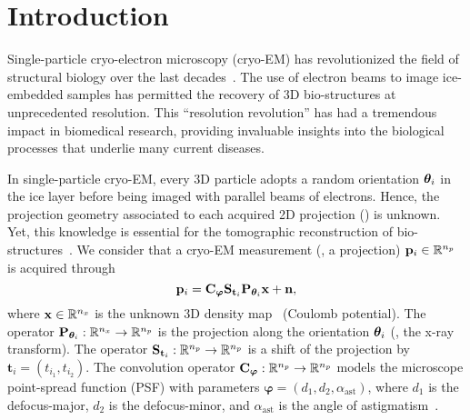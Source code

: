 \section{Introduction}\label{sec:introduction}

Single-particle cryo-electron microscopy (cryo-EM) has revolutionized the field of structural biology over the last decades~\cite{dubochet1988cryo, frank2006three, chap0-nat2015MethodYear}.
The use of electron beams to image ice-embedded samples has permitted the recovery of 3D bio-structures at unprecedented resolution.
This ``resolution revolution'' has had a tremendous impact in biomedical research, providing invaluable insights into the biological processes that underlie many current diseases.

In single-particle cryo-EM, every 3D particle adopts a random orientation ${\boldsymbol{\theta}}_i$ in the ice layer before being imaged with parallel beams of electrons.
Hence, the projection geometry associated to each acquired 2D projection () is unknown.
Yet, this knowledge is essential for the tomographic reconstruction of bio-structures~\cite{Natterer2001mathematics}.
We consider that a cryo-EM measurement (\ie, a projection) $\mathbf{p}_i \in \mathbb{R}^{n_p}$ is acquired through
\begin{equation}
    \label{eqn:imaging-model}
    \mathbf{p}_i = \mathbf{C}_{\boldsymbol\varphi} \mathbf{S}_{\mathbf{t}_i} \mathbf{P}_{{\boldsymbol{\theta}}_i} \mathbf{x} + \mathbf{n},
\end{equation}
where $\mathbf{x} \in \mathbb{R}^{n_x}$ is the unknown 3D density map~\cite{dimaio_creating_2007} (Coulomb potential).
The operator $\mathbf{P}_{{\boldsymbol{\theta}}_i}: \mathbb{R}^{n_x} \to \mathbb{R}^{n_p}$ is the projection along the orientation ${\boldsymbol{\theta}}_i$ (\ie, the x-ray transform).
The operator $\mathbf{S}_{\mathbf{t}_i}: \mathbb{R}^{n_p} \to \mathbb{R}^{n_p}$ is a shift of the projection by $\mathbf{t}_i = (t_{i_1}, t_{i_2})$.
The convolution operator $\mathbf{C}_{\boldsymbol\varphi}: \mathbb{R}^{n_p} \to \mathbb{R}^{n_p}$ models the microscope point-spread function (PSF) with parameters $\boldsymbol\varphi = (d_1, d_2, \alpha_\mathrm{ast})$, where $d_1$ is the defocus-major, $d_2$ is the defocus-minor, and $\alpha_\mathrm{ast}$ is the angle of astigmatism~\cite{vulovic_image_2013,rullgard_simulation_2011}.
